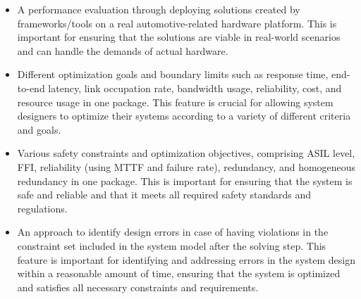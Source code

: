 \begin{itemize}
    \item A performance evaluation through deploying solutions created by frameworks/tools on a real automotive-related hardware platform. This is important for ensuring that the solutions are viable in real-world scenarios and can handle the demands of actual hardware.

    \item Different optimization goals and boundary limits such as response time, end-to-end latency, link occupation rate, bandwidth usage, reliability, cost, and resource usage in one package. This feature is crucial for allowing system designers to optimize their systems according to a variety of different criteria and goals.

    \item Various safety constraints and optimization objectives, comprising ASIL level, FFI, reliability (using MTTF and failure rate), redundancy, and homogeneous redundancy in one package. This is important for ensuring that the system is safe and reliable and that it meets all required safety standards and regulations.

    \item An approach to identify design errors in case of having violations in the constraint set included in the system model after the solving step. This feature is important for identifying and addressing errors in the system design within a reasonable amount of time, ensuring that the system is optimized and satisfies all necessary constraints and requirements.

\end{itemize}


